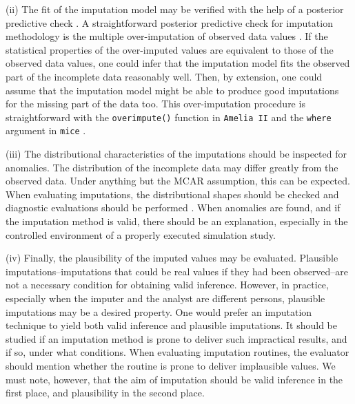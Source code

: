 \documentclass[bimj,fleqn]{w-art}
\begin{document}
(ii) The fit of the imputation model may be verified with the help of a posterior predictive check \citep[][]{nguy17, zhao22}. A straightforward posterior predictive check for imputation methodology is the multiple over-imputation of observed data values \citep{caiPPC}. If the statistical properties of the over-imputed values are equivalent to those of the observed data values, one could infer that the imputation model fits the observed part of the incomplete data reasonably well. Then, by extension, one could assume that the imputation model might be able to produce good imputations for the missing part of the data too. This over-imputation procedure is straightforward with the \texttt{overimpute()} function in \texttt{Amelia II} \citep{amelia} and the \texttt{where} argument in \texttt{mice} \citep{mice, caiPPC}.

(iii) The distributional characteristics of the imputations should be inspected for anomalies. The distribution of the incomplete data may differ greatly from the observed data. Under anything but the MCAR assumption, this can be expected. When evaluating imputations, the distributional shapes should be checked and diagnostic evaluations should be performed \citep[see][for a detailed overview of diagnostic evaluation for multivariate imputations]{abayomi2008diagnostics}. When anomalies are found, and if the imputation method is valid, there should be an explanation, especially in the controlled environment of a properly executed simulation study. 

(iv) Finally, the plausibility of the imputed values may be evaluated. Plausible imputations--imputations that could be real values if they had been observed--are not a necessary condition for obtaining valid inference. However, in practice, especially when the imputer and the analyst are different persons, plausible imputations may be a desired property. One would prefer an imputation technique to yield both valid inference and plausible imputations. It should be studied if an imputation method is prone to deliver such impractical results, and if so, under what conditions. When evaluating imputation routines, the evaluator should mention whether the routine is prone to deliver implausible values. We must note, however, that the aim of imputation should be valid inference in the first place, and plausibility in the second place. 
\end{document}
